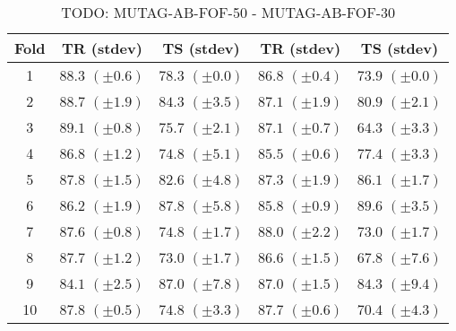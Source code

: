 \documentclass[10pt,a4paper]{book}
\begin{document}
\begin{table}[tbph]
\caption{TODO: MUTAG-AB-FOF-50 - MUTAG-AB-FOF-30}
\label{TODO}
\centering
\begin{tabular}{c*{4}{c}}
\toprule
Fold & TR (stdev) & TS (stdev) & TR (stdev) & TS (stdev)\\
\midrule
1 & $88.3$ $(\pm 0.6)$ & $78.3$ $(\pm 0.0)$ & $86.8$ $(\pm 0.4)$ & $73.9$ $(\pm 0.0)$\\
2 & $88.7$ $(\pm 1.9)$ & $84.3$ $(\pm 3.5)$ & $87.1$ $(\pm 1.9)$ & $80.9$ $(\pm 2.1)$\\
3 & $89.1$ $(\pm 0.8)$ & $75.7$ $(\pm 2.1)$ & $87.1$ $(\pm 0.7)$ & $64.3$ $(\pm 3.3)$\\
4 & $86.8$ $(\pm 1.2)$ & $74.8$ $(\pm 5.1)$ & $85.5$ $(\pm 0.6)$ & $77.4$ $(\pm 3.3)$\\
5 & $87.8$ $(\pm 1.5)$ & $82.6$ $(\pm 4.8)$ & $87.3$ $(\pm 1.9)$ & $86.1$ $(\pm 1.7)$\\
6 & $86.2$ $(\pm 1.9)$ & $87.8$ $(\pm 5.8)$ & $85.8$ $(\pm 0.9)$ & $89.6$ $(\pm 3.5)$\\
7 & $87.6$ $(\pm 0.8)$ & $74.8$ $(\pm 1.7)$ & $88.0$ $(\pm 2.2)$ & $73.0$ $(\pm 1.7)$\\
8 & $87.7$ $(\pm 1.2)$ & $73.0$ $(\pm 1.7)$ & $86.6$ $(\pm 1.5)$ & $67.8$ $(\pm 7.6)$\\
9 & $84.1$ $(\pm 2.5)$ & $87.0$ $(\pm 7.8)$ & $87.0$ $(\pm 1.5)$ & $84.3$ $(\pm 9.4)$\\
10 & $87.8$ $(\pm 0.5)$ & $74.8$ $(\pm 3.3)$ & $87.7$ $(\pm 0.6)$ & $70.4$ $(\pm 4.3)$\\
\bottomrule
\end{tabular}
\end{table}


\end{document}
